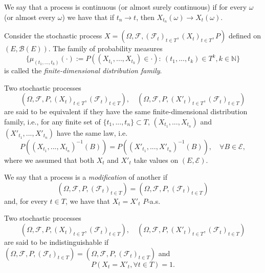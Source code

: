 \begin{definition}
	We say that a process is continuous (or almost surely continuous)
	if for every $\omega$ (or almost every $\omega$) we have that
	if $t_n \to t$, then $X_{t_n}(\omega) \to X_{t}(\omega)$.
\end{definition}

\begin{definition}
	Consider the stochastic process
	$X = (\Omega, \mathcal F, (\mathcal F_t)_{t \in T}, (X_t)_{t \in T}, P)$
	defined on $(E,\mathcal B(E))$. The family of probability measures
	\begin{displaymath}
		\{
		\mu_{(t_1,...,t_k)}(\cdot) := P((X_{t_1},...,X_{t_k})\in \cdot) : \
		(t_1,...,t_k) \in T^k, k \in \mathbb N
		\}
	\end{displaymath}
	is called the \textit{finite-dimensional distribution family}.
\end{definition}

\begin{definition}
	Two stochastic processes
	\begin{displaymath}
		(\Omega, \mathcal F, P, (X_t)_{t \in T}, (\mathcal F_t)_{t\in T}),\quad
		(\Omega, \mathcal F, P, (X'_t)_{t \in T}, (\mathcal F_t)_{t\in T})
	\end{displaymath}
	are said to be equivalent if they have the same finite-dimensional distribution family,
	i.e.,
	for any finite set of $\{t_1,...,t_n\} \subset T$,
	$(X_{t_1},...,X_{t_n})$ and
	$(X'_{t_1},...,X'_{t_n})$ have the same law, i.e.
	\begin{displaymath}
		P((X_{t_1},...,X_{t_n})^{-1}(B)) =
		P((X'_{t_1},...,X'_{t_n})^{-1}(B)), \quad \forall B \in \mathcal E,
	\end{displaymath}
	where we assumed that both $X_t$ and $X'_t$ take values on $(E,\mathcal E)$.
	\label{def:equivalent}
\end{definition}

\begin{definition}[Modification]
	We say that a process is a \textit{modification} of another if
	\begin{displaymath}
		(\Omega, \mathcal F, P, (\mathcal F_t)_{t\in T})
		= (\Omega, \mathcal F, P, (\mathcal F_t)_{t\in T})
	\end{displaymath}
	and, for every
	$t \in T$, we have that $X_t = X'_t$ $P$-a.s.
\end{definition}

\begin{definition}[Indistinguishable]
	Two stochastic processes
	\begin{displaymath}
		(\Omega, \mathcal F, P, (X_t)_{t \in T}, (\mathcal F_t)_{t\in T}), \quad
		(\Omega, \mathcal F, P, (X'_t)_{t \in T}, (\mathcal F_t)_{t\in T})
	\end{displaymath}
	are said to be indistinguishable if
	$(\Omega, \mathcal F, P, (\mathcal F_t)_{t\in T})
		= (\Omega, \mathcal F, P, (\mathcal F_t)_{t\in T})$ and
	\begin{displaymath}
		P(X_t = X'_t, \forall t \in T) = 1.
	\end{displaymath}
\end{definition}

